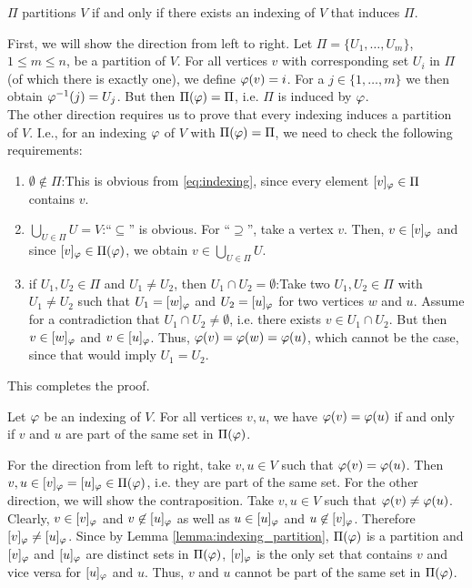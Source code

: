 \begin{lemmarep}
    $\Pi$ partitions $V$ if and only if there exists an indexing of $V$ that induces $\Pi$.\label{lemma:indexing_partition}
\end{lemmarep}
\begin{\appendixproof}
    First, we will show the direction from left to right. Let $\Pi = \{U_1,\dots,U_m\}$, $1\leq m \leq n$, be a partition of $V$. For all vertices $v$ with corresponding set $U_i$ in $\Pi$ (of which there is exactly one), we define $\varphi(v) = i$. For a $j \in \{1,\dots,m\}$ we then obtain $\varphi^{-1}(j) = U_j$. But then $\Pi(\varphi) = \Pi$, i.e. $\Pi$ is induced by $\varphi$. 
    \\
    The other direction requires us to prove that every indexing induces a partition of $V$. I.e., for an indexing $\varphi$ of $V$ with $\Pi(\varphi)=\Pi$, we need to check the following requirements:
    \begin{enumerate}
        \item $\emptyset \not\in \Pi$:\quad This is obvious from \eqref{eq:indexing}, since every element $[v]_\varphi \in \Pi$ contains $v$. %
        \item $\bigcup_{U \in \Pi} U = V$:\quad ``$\subseteq$'' is obvious. For ``$\supseteq$'', take a vertex $v$. Then, $v \in [v]_\varphi$ and since $[v]_\varphi \in \Pi(\varphi)$, we obtain $v \in \bigcup_{U \in \Pi} U$.
        \item if $U_1,U_2 \in \Pi$ and $U_1 \neq U_2$, then $U_1 \cap U_2 = \emptyset$:\quad Take two $U_1, U_2 \in \Pi$ with $U_1 \neq U_2$ such that $U_1 = [w]_\varphi$ and $U_2 = [u]_\varphi$ for two vertices $w$ and $u$. Assume for a contradiction that $U_1 \cap U_2 \neq \emptyset$, i.e. there exists $v \in U_1 \cap U_2$. But then $v \in [w]_\varphi$ and $v \in [u]_\varphi$. Thus, $\varphi(v) = \varphi(w) = \varphi(u)$, which cannot be the case, since that would imply $U_1 = U_2$.
    \end{enumerate}
    This completes the proof.
\end{\appendixproof}

\begin{lemmarep}
    Let $\varphi$ be an indexing of $V$. For all vertices $v,u$, we have $\varphi(v) = \varphi(u)$ if and only if $v$ and $u$ are part of the same set in $\Pi(\varphi)$. \label{lemma:indexing_same_set}
\end{lemmarep}
\begin{\appendixproof}
    For the direction from left to right, take $v,u\in V$ such that $\varphi(v)=\varphi(u)$. Then $v,u \in [v]_\varphi = [u]_\varphi \in \Pi(\varphi)$, i.e. they are part of the same set. For the other direction, we will show the contraposition. Take $v,u\in V$ such that $\varphi(v)\neq \varphi(u)$. Clearly, $v \in [v]_\varphi$ and $v \not\in [u]_\varphi$ as well as $u \in [u]_\varphi$ and $u \not\in [v]_\varphi$. Therefore $[v]_\varphi \neq [u]_\varphi$. Since by Lemma \ref{lemma:indexing_partition}, $\Pi(\varphi)$ is a partition and $[v]_\varphi$ and $[u]_\varphi$ are distinct sets in $\Pi(\varphi)$, $[v]_\varphi$ is the only set that contains $v$ and vice versa for $[u]_\varphi$ and $u$. Thus, $v$ and $u$ cannot be part of the same set in $\Pi(\varphi)$. 
\end{\appendixproof}

